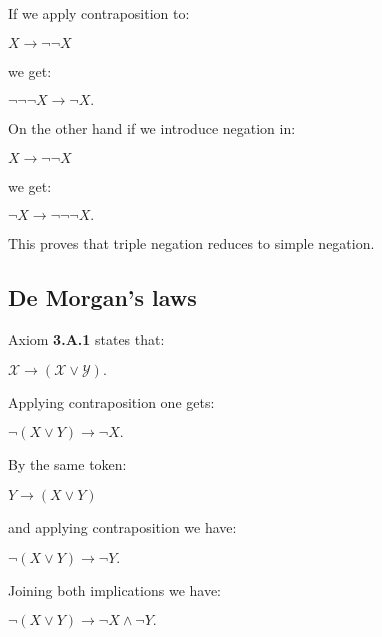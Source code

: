 \documentclass[12pt]{article}
\begin{document}
If we apply contraposition to:

\begin{center}
$X \rightarrow \neg \neg X$
\end{center}

we get: 

\begin{center}
$\neg \neg \neg X \rightarrow \neg X.$
\end{center}

On the other hand if we introduce negation in:

\begin{center}
$X \rightarrow \neg \neg X$
\end{center}

we get:

\begin{center}
$\neg X \rightarrow \neg \neg \neg X.$
\end{center} 

This proves that triple negation reduces to simple negation.

\subsection{De Morgan's laws}

Axiom \textbf{3.A.1} states that:

\begin{center}
$\mathcal{X} \rightarrow (\mathcal{X} \vee \mathcal{Y}).$
\end{center}

Applying contraposition one gets:

\begin{center}
$\neg (X \vee Y) \rightarrow \neg X.$
\end{center}

By the same token: 

\begin{center}
$Y \rightarrow (X \vee Y)$
\end{center}

and applying contraposition we have:

\begin{center}
$\neg (X \vee Y) \rightarrow \neg Y.$
\end{center}

Joining both implications we have:

\begin{center}
$\neg (X \vee Y) \rightarrow \neg X \wedge \neg Y.$
\end{center}
\end{document}
